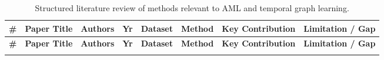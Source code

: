 \begingroup
\setlength{\tabcolsep}{3pt}
\footnotesize
\renewcommand{\arraystretch}{1.2}
\begin{longtable}{@{} c p{2.7cm} p{1.7cm} c p{1.3cm} p{1.5cm} p{2.1cm} p{2.1cm} @{}}
\caption[Literature Review Table]{Structured literature review of methods relevant to AML and temporal graph learning.}
\label{tab:lit_review}\\
\toprule
\textbf{\#} & \textbf{Paper Title} & \textbf{Authors} & \textbf{Yr} & \textbf{Dataset} & \textbf{Method} & \textbf{Key Contribution} & \textbf{Limitation / Gap} \\
\midrule
\endfirsthead

\toprule
\textbf{\#} & \textbf{Paper Title} & \textbf{Authors} & \textbf{Yr} & \textbf{Dataset} & \textbf{Method} & \textbf{Key Contribution} & \textbf{Limitation / Gap} \\
\midrule
\endhead

\bottomrule
\endfoot

\bottomrule
\endlastfoot


\end{longtable}

